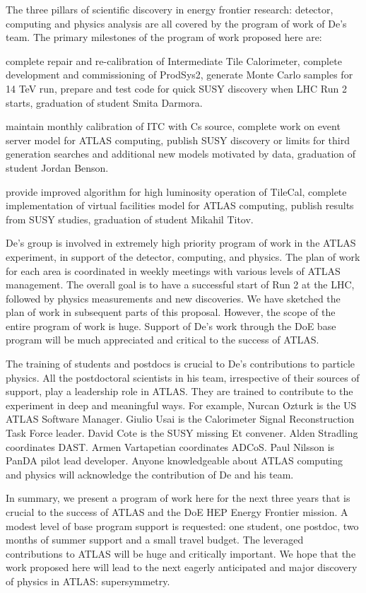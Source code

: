 The three pillars of scientific discovery in energy frontier research: detector, computing and physics analysis are all covered by the program of work of De's team. The primary milestones of the program of work proposed here are:
\begin{description}
\item[2014] complete repair and re-calibration of Intermediate Tile Calorimeter, complete development and commissioning of ProdSys2, generate Monte Carlo samples for 14 TeV run, prepare and test code for quick SUSY discovery when LHC Run 2 starts, graduation of student Smita Darmora.
\item[2015] maintain monthly calibration of ITC with Cs source, complete work on event server model for ATLAS computing, publish SUSY discovery or limits for third generation searches and additional new models motivated by data, graduation of student Jordan Benson.
\item[2016] provide improved algorithm for high luminosity operation of TileCal, complete implementation of virtual facilities model for ATLAS computing, publish results from SUSY studies, graduation of student Mikahil Titov.
\end{description}

De's group is involved in extremely high priority program of work in the ATLAS experiment, in support of the detector, computing, and physics. The plan of work for each area is coordinated in weekly meetings with various levels of ATLAS management. The overall goal is to have a successful start of Run 2 at the LHC, followed by physics measurements and new discoveries. We have sketched the plan of work in subsequent parts of this proposal. However, the scope of the entire program of work is huge. Support of De's work through the DoE base program will be much appreciated and critical to the success of ATLAS.

The training of students and postdocs is crucial to De's contributions to particle physics. All the postdoctoral scientists in his team, irrespective of their sources of support, play a leadership role in ATLAS. They are trained to contribute to the experiment in deep and meaningful ways. For example, Nurcan Ozturk is the US ATLAS Software Manager. Giulio Usai is the Calorimeter Signal Reconstruction Task Force leader. David Cote is the SUSY missing Et convener. Alden Stradling coordinates DAST. Armen Vartapetian coordinates ADCoS. Paul Nilsson is PanDA pilot lead developer. Anyone knowledgeable about ATLAS computing and physics will acknowledge the contribution of De and his team.

In summary, we present a program of work here for the next three years that is crucial to the success of ATLAS and the DoE HEP Energy Frontier mission. A modest level of base program support is requested: one student, one postdoc, two months of summer support and a small travel budget. The leveraged contributions to ATLAS will be huge and critically important. We hope that the work proposed here will lead to the next eagerly anticipated and major discovery of physics in ATLAS: supersymmetry.

